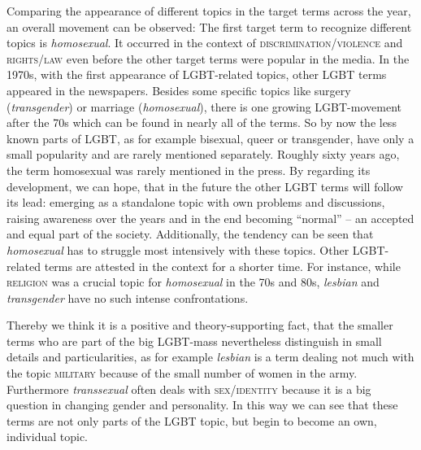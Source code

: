 \documentclass[10pt,a4paper,twocolumn]{scrartcl}
\begin{document}
Comparing the appearance of different topics in the target terms across the year, an overall movement can be observed: The first target term to recognize different topics is \textit{homosexual}. It occurred in the context of \textsc{discrimination/violence} and \textsc{rights/law} even before the other target terms were popular in the media. In the 1970s, with the first appearance of LGBT-related topics, other LGBT terms appeared in the newspapers. Besides some specific topics like surgery (\textit{transgender}) or marriage (\textit{homosexual}), there is one growing LGBT-movement after the 70s which can be found in nearly all of the terms. So by now the less known parts of LGBT, as for example bisexual, queer or transgender, have only a small popularity and are rarely mentioned separately. Roughly sixty years ago, the term homosexual was rarely mentioned in the press. By regarding its development, we can hope, that in the future the other LGBT terms will follow its lead: emerging as a standalone topic with own problems and discussions, raising awareness over the years and in the end becoming ``normal'' -- an accepted and equal part of the society. Additionally, the tendency can be seen that \textit{homosexual} has to struggle most intensively with these topics. Other LGBT-related terms are attested in the context for a shorter time. For instance, while \textsc{religion} was a crucial topic for \textit{homosexual} in the 70s and 80s, \textit{lesbian} and \textit{transgender} have no such intense confrontations.

Thereby we think it is a positive and theory-supporting fact, that the smaller terms who are part of the big LGBT-mass nevertheless distinguish in small details and particularities, as for example \textit{lesbian} is a term dealing not much with the topic \textsc{military} because of the small number of women in the army. Furthermore \textit{transsexual} often deals with \textsc{sex/identity} because it is a big question in changing gender and personality. In this way we can see that these terms are not only parts of the LGBT topic, but begin to become an own, individual topic.
\end{document}
